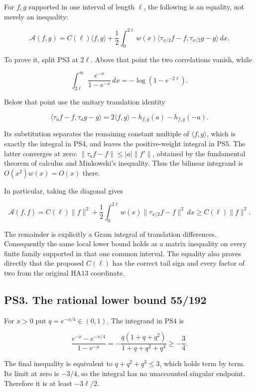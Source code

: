 \documentclass[
  10pt,
  a4paper,
]{article}
\begin{document}
For \(f,g\) supported in one interval of length \(\ell\), the following
is an equality, not merely an inequality:

\[
\boxed{\mathcal A(f,g)=C(\ell)\langle f,g\rangle
+\frac12\int_0^{2\ell}w(x)
\langle\tau_{x/2}f-f,\tau_{x/2}g-g\rangle\,dx.}
\tag{PS5}
\]

To prove it, split PS3 at \(2\ell\). Above that point the two
correlations vanish, while

\[
\int_{2\ell}^\infty\frac{e^{-x}}{1-e^{-x}}\,dx
=-\log(1-e^{-2\ell}).
\]

Below that point use the unitary translation identity

\[
\langle\tau_a f-f,\tau_a g-g\rangle
=2\langle f,g\rangle-h_{f,g}(a)-h_{f,g}(-a).
\]

Its substitution separates the remaining constant multiple of
\(\langle f,g\rangle\), which is exactly the integral in PS4, and leaves
the positive-weight integral in PS5. The latter converges at zero:
\(\|\tau_a f-f\|\le |a|\|f'\|\), obtained by the fundamental theorem of
calculus and Minkowski's inequality. Thus the bilinear integrand is
\(O(x^2)w(x)=O(x)\) there.

In particular, taking the diagonal gives

\[
\mathcal A(f,f)=C(\ell)\|f\|^2
+\frac12\int_0^{2\ell}w(x)
\|\tau_{x/2}f-f\|^2\,dx
\ge C(\ell)\|f\|^2.
\tag{PS6}
\]

The remainder is explicitly a Gram integral of translation differences.
Consequently the same local lower bound holds as a matrix inequality on
every finite family supported in that one common interval. The equality
also proves directly that the proposed \(C(\ell)\) has the correct tail
sign and every factor of two from the original HA13 coordinate.

\subsection{PS3. The rational lower bound
55/192}\label{ps3.-the-rational-lower-bound-55192}

For \(x>0\) put \(q=e^{-x/4}\in(0,1)\). The integrand in PS4 is

\[
\frac{e^{-x}-e^{-x/4}}{1-e^{-x}}
=-\frac{q(1+q+q^2)}{1+q+q^2+q^3}\ge-\frac34.
\tag{PS7}
\]

The final inequality is equivalent to \(q+q^2+q^3\le3\), which holds
term by term. Its limit at zero is \(-3/4\), so the integral has no
unaccounted singular endpoint. Therefore it is at least \(-3\ell/2\).
\end{document}

